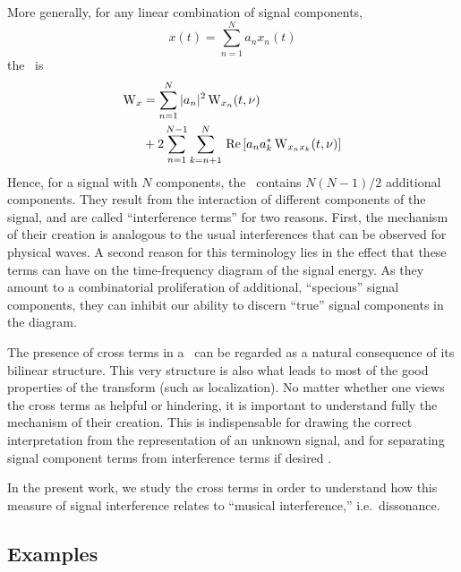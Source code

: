 More generally, for any linear combination of signal components,
\[
  x(t) = \sum_{n=1}^N a_n x_n(t)
\]
the \WT\ is
\begin{align}
  \operatorname{W}_{x} &= \sum_{n=1}^N|a_n|^2 \operatorname{W}_{x_n}(t,\nu) \label{eq:WignerSum} \\
 &+ 2\sum_{n=1}^{N-1}\sum_{k=n+1}^N\,
                 \mbox{Re}\left[a_n a_k^* \operatorname{W}_{x_nx_k}(t,\nu)\right]
\nonumber
\end{align}
Hence, for a signal with $N$ components, the \WT\ contains 
$N(N-1)/2$
additional components.  They result from the interaction of different
components of the signal, and are called ``interference terms'' for
two reasons.  First, the mechanism of their creation is analogous to
the usual interferences that can be observed for physical waves.  A
second reason for this terminology lies in the
effect that these terms can have on the %
time-frequency diagram of the signal energy.  As they amount to a
combinatorial proliferation of additional, ``specious'' signal
components, they can inhibit our ability to discern ``true'' signal 
components in the diagram.  

The presence of cross terms in a \WT\ can be regarded as a
natural consequence of its bilinear structure.  This very structure is also
what leads to most of the good properties of the transform (such as
localization).    
No matter whether one views the cross terms as helpful or hindering,
it is important to understand fully the mechanism of their creation.
This is indispensable for drawing the correct interpretation from the 
representation of an unknown signal, and for separating signal component
terms from interference terms if desired \cite{Flandrin:1999}.

In the present work, we study the
cross terms in order to understand how this measure of signal interference
relates to ``musical interference,'' i.e.~dissonance. 

\subsection{Examples}
\label{sec:examples}
\def\a{\mathbf{a}}
\def\b{\mathbf{b}}

